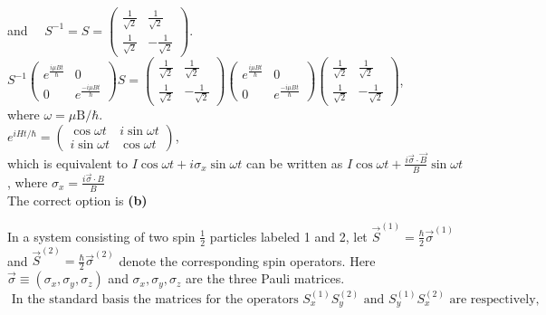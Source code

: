 \begin{enumerate}
\begin{answer}
	and $\quad S^{-1}=S=\left(\begin{array}{cc}\frac{1}{\sqrt{2}} & \frac{1}{\sqrt{2}} \\ \frac{1}{\sqrt{2}} & -\frac{1}{\sqrt{2}}\end{array}\right)$.\\
	$S^{-1}\left(\begin{array}{cc}e^{\frac{i \mu B t}{\hbar}} & 0 \\ 0 & e^{\frac{-i \mu B t}{\hbar}}\end{array}\right) S=\left(\begin{array}{cc}\frac{1}{\sqrt{2}} & \frac{1}{\sqrt{2}} \\ \frac{1}{\sqrt{2}} & -\frac{1}{\sqrt{2}}\end{array}\right)\left(\begin{array}{cc}e^{\frac{i \mu B t}{\hbar}} & 0 \\ 0 & e^{\frac{-i \mu B t}{\hbar}}\end{array}\right)\left(\begin{array}{cc}\frac{1}{\sqrt{2}} & \frac{1}{\sqrt{2}} \\ \frac{1}{\sqrt{2}} & -\frac{1}{\sqrt{2}}\end{array}\right)$,\\ where $\omega=\mu \mathrm{B} / \hbar$.\\
	$e^{i H t / \hbar}=\left(\begin{array}{cc}\cos \omega t & i \sin \omega t \\ i \sin \omega t & \cos \omega t\end{array}\right)$,\\
	 which is equivalent to $I \cos \omega t+i \sigma_{x} \sin \omega t$ can be written
	as $I \cos \omega t+\frac{i \vec{\sigma} \cdot \vec{B}}{B} \sin \omega t$, where $\sigma_{x}=\frac{i \vec{\sigma} \cdot B}{B}$\\
	The correct option is \textbf{(b)}
\end{answer}
\begin{minipage}{\textwidth}
	\item  In a system consisting of two spin $\frac{1}{2}$ particles labeled 1 and 2, let $\vec{S}^{(1)}=\frac{\hbar}{2} \vec{\sigma}^{(1)}$ and $\vec{S}^{(2)}=\frac{\hbar}{2} \vec{\sigma}^{(2)}$ denote the corresponding spin operators. Here $\vec{\sigma} \equiv\left(\sigma_{x}, \sigma_{y}, \sigma_{z}\right)$ and $\sigma_{x}, \sigma_{y}, \sigma_{z}$ are the three Pauli matrices.\\
	$\text { In the standard basis the matrices for the operators } S_{x}^{(1)} S_{y}^{(2)} \text { and } S_{y}^{(1)} S_{x}^{(2)} \text { are respectively, }$

\end{minipage}
\end{enumerate}
